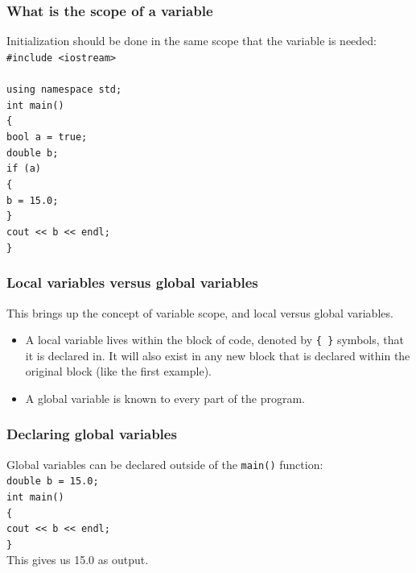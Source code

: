 \documentclass{if-beamer}
\begin{document}
\begin{frame}
\frametitle{What is the scope of a variable}
\vspace{1cm}
Initialization should be done in the same scope that the variable is
needed: \\
{\footnotesize \texttt{\#include <iostream>}} \\
{\footnotesize \texttt{}}\\
{\footnotesize \texttt{using namespace std;}} \\
{\footnotesize \texttt{int main()}} \\
{\footnotesize \texttt{\{}} \\
{\footnotesize \texttt{\quad \quad bool a = true;}} \\
{\footnotesize \texttt{\quad \quad double b;}} \\
{\footnotesize \texttt{\quad \quad if (a)}} \\
{\footnotesize \texttt{\quad \quad \{}} \\
{\footnotesize \texttt{\quad \quad \quad \quad b = 15.0;}} \\
{\footnotesize \texttt{\quad \quad \}}} \\
{\footnotesize \texttt{\quad \quad cout << b << endl;}} \\
{\footnotesize \texttt{\}}} \\
\end{frame}

\begin{frame}
\frametitle{Local variables versus global variables}
This brings up the concept of variable scope, and local versus global
variables.
\begin{itemize}
\item A local variable lives within the block of code, denoted by
\texttt{\{ \}} symbols, that it is declared in. It will also exist in
any new block that is declared within the original block (like
the first example).
\item A global variable is known to every part of the program.
\end{itemize}
\end{frame}

\begin{frame}
\frametitle{Declaring global variables}
Global variables can be declared outside of the \texttt{main()} function: \\
{\footnotesize \texttt{double b = 15.0;}} \\
{\footnotesize \texttt{int main()}} \\
{\footnotesize \texttt{\{}} \\
{\footnotesize \texttt{\quad \quad cout << b << endl;}} \\
{\footnotesize \texttt{\}}} \\
This gives us 15.0 as output.
\end{frame}
\end{document}
